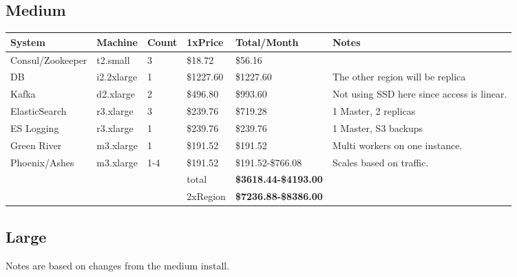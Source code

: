 \documentclass[11pt]{article}
\begin{document}
\subsection{Medium}
\begin{center}
    \begin{tabular}{| l l l l | l | p{3cm} |}
        \hline
        System & Machine & Count & 1xPrice & Total/Month & Notes \\
        \hline \hline
        Consul/Zookeeper & t2.small & 3 & \$18.72 & \$56.16 & \\ \hline
        DB & i2.2xlarge & 1 & \$1227.60 & \$1227.60 & The other region will be replica \\ \hline
        Kafka & d2.xlarge & 2 & \$496.80 & \$993.60 & Not using SSD here since access is linear.\\ \hline
        ElasticSearch & r3.xlarge & 3 & \$239.76 & \$719.28 & 1 Master, 2 replicas\\ \hline
        ES Logging & r3.xlarge & 1 & \$239.76 & \$239.76 & 1 Master, S3 backups\\ \hline
        Green River & m3.xlarge & 1 & \$191.52 & \$191.52 & Multi workers on one instance.\\ \hline
        Phoenix/Ashes & m3.xlarge & 1-4 & \$191.52 & \$191.52-\$766.08 & Scales based on traffic.\\ \hline
        & & & total & {\bf \$3618.44-\$4193.00} & \\ \hline
        & & & 2xRegion & {\bf \$7236.88-\$8386.00} & \\ \hline
    \end{tabular}
\end{center}

\subsection{Large}

Notes are based on changes from the medium install.
\end{document}
